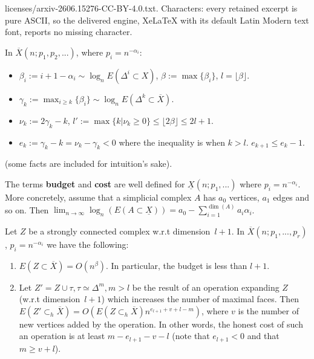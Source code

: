 \documentclass[10pt,a4paper]{amsart}
\newcommand{\di}{dimension}
\begin{document}
licenses/arxiv-2606.15276-CC-BY-4.0.txt. Characters: every retained excerpt is pure ASCII, so the delivered engine, XeLaTeX with its default Latin Modern text font, reports no missing character.
\begin{definition}\label{FNNotation}
    In $\overline{X}(n;p_1,p_2,...)$, where $p_i=n^{-\alpha_i}$:
    \begin{itemize}
        \item $\beta_i:=i+1-\alpha_i\sim \log_n E(\Delta^i\subset X)$, $\beta:=\max\{\beta_i\}$, $l=\lfloor\beta \rfloor$.
        \item $\gamma_k:=\max_{i\ge k}\{\beta_i\}\sim \log_n E(\Delta^k\subset \overline{X})$.
        \item $\nu_k:=2\gamma_k-k$,  $l':=\max\{k| \nu_k\ge 0\}\le \lfloor 2\beta \rfloor\le 2l+1$.
        \item $e_k:=\gamma_k-k=\nu_k-\gamma_k <0$ where the inequality is when $k>l$. $e_{k+1}\le e_k-1$.
    \end{itemize}
    (some facts are included for intuition's sake).
    \end{definition}

\begin{proposition}\label{propBudCostLower}
    The terms \textbf{budget} and \textbf{cost} are well defined for $\underline{X}(n;p_1,...)$ where $p_i=n^{-\alpha_i}$.
    More concretely, assume that a simplicial complex $A$ has $a_0$ vertices, $a_1$ edges and so on. Then $\lim_{n\to \infty}\log_n(E(A\subset \underline{X}))=a_0-\sum_{i=1} ^{\dim(A)}a_i\alpha_i$.
\end{proposition}

\begin{lemma}\label{lem:upperBudgetCost}
    Let $Z$ be a strongly connected complex w.r.t \di \ $l+1$. In $\overline{X}(n;p_1,...,p_r)$, $p_i=n^{
    -\alpha_i}$ we have the following:
    \begin{enumerate}
        \item $E(Z\subset \overline{X})=O(n^\beta)$. In particular, the budget is less than $l+1$.
        \item Let $Z'=Z\cup \tau, \tau\simeq\Delta^m, m>l$ be the result of an operation expanding $Z$ (w.r.t \di\ $l+1$) which increases the number of maximal faces. Then $E(Z'\subset_h \overline{X})=O(E(Z\subset_h \overline{X})n^{e_{l+1}+v+l-m})$, where $v$ is the number of new vertices added by the operation.
        In other words, the honest cost of such an operation is at least $m-e_{l+1}-v-l$ (note that $e_{l+1}<0$ and that $m\ge v+l$).
    \end{enumerate}
\end{lemma}
\end{document}
